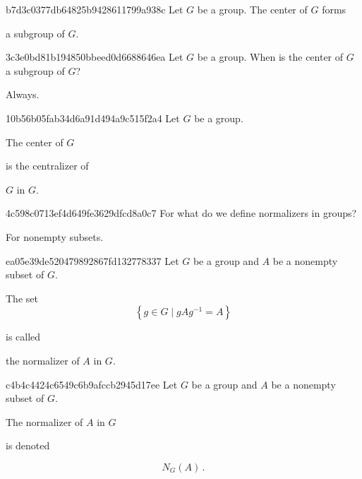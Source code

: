 \begin{note}{b7d3c0377db64825b9428611799a938c}
    Let \({ G }\) be a group.
    The center of \({ G }\) forms \begin{icloze}{1}a subgroup of \({ G }\).\end{icloze}
\end{note}

\begin{note}{3c3e0bd81b194850bbeed0d6688646ea}
    Let \({ G }\) be a group.
    When is the center of \({ G }\) a subgroup of \({ G }\)?

    \begin{cloze}{1}
        Always.
    \end{cloze}
\end{note}

\begin{note}{10b56b05fab34d6a91d494a9c515f2a4}
    Let \({ G }\) be a group.
    \begin{icloze}{2}The center of \({ G }\)\end{icloze} is the centralizer of \begin{icloze}{1}\({ G }\) in \({ G }\).\end{icloze}
\end{note}

\begin{note}{4c598c0713ef4d649fe3629dfcd8a0c7}
    For what do we define normalizers in groups?

    \begin{cloze}{1}
        For nonempty subsets.
    \end{cloze}
\end{note}

\begin{note}{ea05e39de520479892867fd132778337}
    Let \({ G }\) be a group and \({ A }\) be a nonempty subset of \({ G }\).
    \begin{icloze}{2}
        The set
        \[
            \left\{ g \in G \mid gAg^{-1} = A \right\}
        \]
    \end{icloze}
    is called \begin{icloze}{1}the normalizer of \({ A }\) in \({ G }\).\end{icloze}
\end{note}

\begin{note}{c4b4c4424c6549c6b9afccb2945d17ee}
    Let \({ G }\) be a group and \({ A }\) be a nonempty subset of \({ G }\).
    \begin{icloze}{2}The normalizer of \({ A }\) in \({ G }\)\end{icloze} is denoted
    \begin{icloze}{1}
        \[
            N_G(A)\,.
        \]
    \end{icloze}
\end{note}

